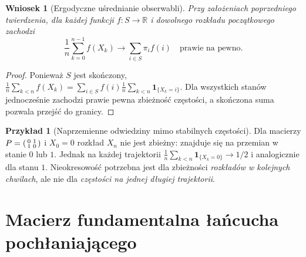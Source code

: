 \documentclass[11pt,a4paper,oneside]{report}
\numberwithin{equation}{chapter}
\theoremstyle{plain}
\newtheorem{wniosek}[twierdzenie]{Wniosek}
\theoremstyle{definition}
\newtheorem{przyklad}{Przykład}[chapter]
\theoremstyle{remark}
\newcommand{\R}{\mathbb{R}}
\newcommand{\ind}[1]{\mathbf{1}_{#1}}
\begin{document}
\begin{wniosek}[Ergodyczne uśrednianie obserwabli]
Przy założeniach poprzedniego twierdzenia,
dla każdej funkcji $f:S\to\R$ i dowolnego
rozkładu początkowego zachodzi
\[
\frac1n\sum_{k=0}^{n-1}f(X_k)
\longrightarrow\sum_{i\in S}\pi_i f(i)
\quad\text{prawie na pewno}.
\]
\end{wniosek}
\begin{proof}
Ponieważ $S$ jest skończony,
$\frac1n\sum_{k<n}f(X_k)=
\sum_{i\in S}f(i)\frac1n\sum_{k<n}\ind{\{X_k=i\}}$.
Dla wszystkich stanów jednocześnie zachodzi
prawie pewna zbieżność częstości, a skończona
suma pozwala przejść do granicy.
\end{proof}

\begin{przyklad}[Naprzemienne odwiedziny mimo stabilnych częstości]
Dla macierzy
$P=\begin{psmallmatrix}0&1\\1&0\end{psmallmatrix}$
i $X_0=0$ rozkład $X_n$ nie jest zbieżny:
znajduje się na przemian w stanie $0$ lub $1$.
Jednak na każdej trajektorii
$\frac1n\sum_{k<n}\ind{\{X_k=0\}}\to1/2$
i analogicznie dla stanu $1$. Nieokresowość
potrzebna jest dla zbieżności \emph{rozkładów
w kolejnych chwilach}, ale nie dla \emph{częstości
na jednej długiej trajektorii}.
\end{przyklad}

\section{Macierz fundamentalna łańcucha pochłaniającego}
\end{document}
